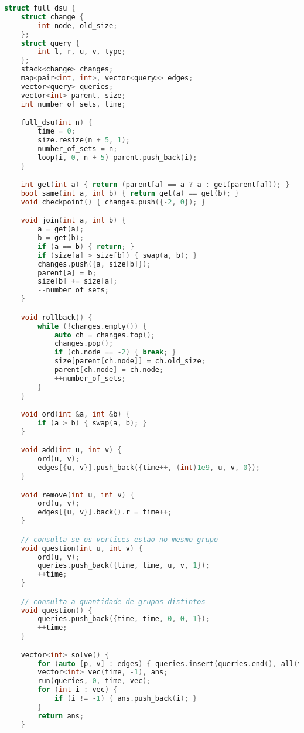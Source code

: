\documentclass[11pt, a4paper, twoside]{article}
\begin{document}
\begin{lstlisting}[language=C++]
struct full_dsu {
    struct change {
        int node, old_size;
    };
    struct query {
        int l, r, u, v, type;
    };
    stack<change> changes;
    map<pair<int, int>, vector<query>> edges;
    vector<query> queries;
    vector<int> parent, size;
    int number_of_sets, time;

    full_dsu(int n) {
        time = 0;
        size.resize(n + 5, 1);
        number_of_sets = n;
        loop(i, 0, n + 5) parent.push_back(i);
    }

    int get(int a) { return (parent[a] == a ? a : get(parent[a])); }
    bool same(int a, int b) { return get(a) == get(b); }
    void checkpoint() { changes.push({-2, 0}); }

    void join(int a, int b) {
        a = get(a);
        b = get(b);
        if (a == b) { return; }
        if (size[a] > size[b]) { swap(a, b); }
        changes.push({a, size[b]});
        parent[a] = b;
        size[b] += size[a];
        --number_of_sets;
    }

    void rollback() {
        while (!changes.empty()) {
            auto ch = changes.top();
            changes.pop();
            if (ch.node == -2) { break; }
            size[parent[ch.node]] = ch.old_size;
            parent[ch.node] = ch.node;
            ++number_of_sets;
        }
    }

    void ord(int &a, int &b) {
        if (a > b) { swap(a, b); }
    }

    void add(int u, int v) {
        ord(u, v);
        edges[{u, v}].push_back({time++, (int)1e9, u, v, 0});
    }

    void remove(int u, int v) {
        ord(u, v);
        edges[{u, v}].back().r = time++;
    }

    // consulta se os vertices estao no mesmo grupo
    void question(int u, int v) {
        ord(u, v);
        queries.push_back({time, time, u, v, 1});
        ++time;
    }

    // consulta a quantidade de grupos distintos
    void question() {
        queries.push_back({time, time, 0, 0, 1});
        ++time;
    }

    vector<int> solve() {
        for (auto [p, v] : edges) { queries.insert(queries.end(), all(v)); }
        vector<int> vec(time, -1), ans;
        run(queries, 0, time, vec);
        for (int i : vec) {
            if (i != -1) { ans.push_back(i); }
        }
        return ans;
    }


\end{lstlisting}
\end{document}
